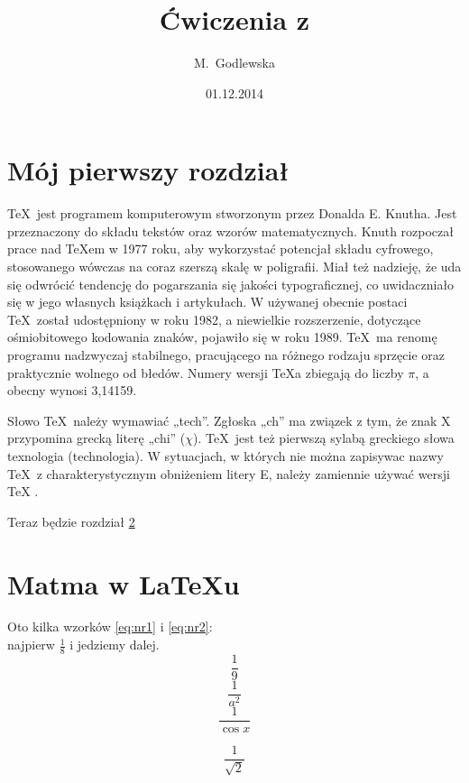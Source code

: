 \documentclass[12pt, a4paper]{article}
\author{M.~Godlewska}
\title{Ćwiczenia z \LaTeXe}
\date{01.12.2014}
\begin{document}
\maketitle

\tableofcontents

\section{Mój pierwszy rozdział}
\label{sec:MojPierwszyRozdzial}

\TeX~jest programem komputerowym stworzonym przez Donalda E. Knutha. Jest przeznaczony do składu tekstów oraz wzorów matematycznych.
Knuth rozpoczał prace nad \TeX em w 1977 roku, aby wykorzystać potencjał
składu cyfrowego, stosowanego wówczas na coraz szerszą skalę w poligrafii.
Miał też nadzieję, że uda się odwrócić tendencję do pogarszania się jakości
typograficznej, co uwidaczniało się w jego własnych książkach i artykułach.
W używanej obecnie postaci \TeX~został udostępniony w roku 1982, a niewielkie
rozszerzenie, dotyczące ośmiobitowego kodowania znaków, pojawiło
się w roku 1989. \TeX~ma renomę programu nadzwyczaj stabilnego, pracującego
na różnego rodzaju sprzęcie oraz praktycznie wolnego od błedów.
Numery wersji \TeX a zbiegają do liczby $\pi$, a obecny wynosi 3,14159.

Słowo \TeX~należy wymawiać „tech”. Zgłoska „ch” ma związek z tym, że
znak X przypomina grecką literę „chi” ($\chi$). \TeX~jest też pierwszą sylabą greckiego
słowa texnologia (technologia). W sytuacjach, w których nie można
zapisywac nazwy \TeX~z charakterystycznym obniżeniem litery E, należy
zamiennie używać wersji TeX \cite{niekrotkie}.

Teraz będzie rozdział \ref{sec:MatmaWLaTeXU}

\section{Matma w \LaTeX u}
\label{sec:MatmaWLaTeXU}

Oto kilka wzorków \eqref{eq:nr1} i \eqref{eq:nr2}:\\
najpierw $\frac{1}{8}$  i jedziemy dalej.
$$\frac{1}{9}$$
	\[\frac{1}{a^2}\]
\begin{equation}
\label{eq:nr1}
	\frac{1}{\cos{x}}
\end{equation}

\begin{equation}
\label{eq:nr2}
	\frac{1}{\sqrt{2}}
\end{equation}
\end{document}
